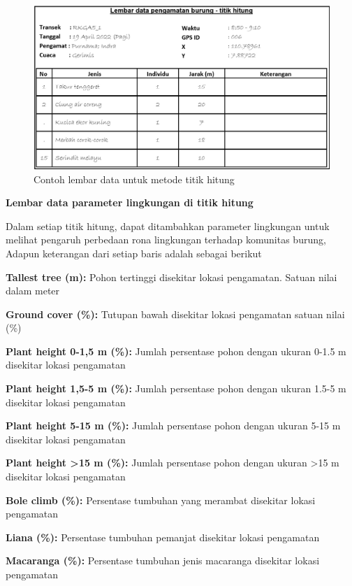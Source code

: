 \documentclass[
  oneside]{book}
\begin{document}
\begin{figure}

{\centering \includegraphics[width=1\linewidth]{images/ldp_th} 

}

\caption{Contoh lembar data untuk metode titik hitung}\label{fig:ldpth}
\end{figure}

\textbf{Lembar data parameter lingkungan di titik hitung}

Dalam setiap titik hitung, dapat ditambahkan parameter lingkungan untuk melihat pengaruh perbedaan rona lingkungan terhadap komunitas burung, Adapun keterangan dari setiap baris adalah sebagai berikut

\textbf{Tallest tree (m):} Pohon tertinggi disekitar lokasi pengamatan. Satuan nilai dalam meter

\textbf{Ground cover (\%):} Tutupan bawah disekitar lokasi pengamatan satuan nilai (\%)

\textbf{Plant height 0-1,5 m (\%):} Jumlah persentase pohon dengan ukuran 0-1.5 m disekitar lokasi pengamatan

\textbf{Plant height 1,5-5 m (\%):} Jumlah persentase pohon dengan ukuran 1.5-5 m disekitar lokasi pengamatan

\textbf{Plant height 5-15 m (\%):} Jumlah persentase pohon dengan ukuran 5-15 m disekitar lokasi pengamatan

\textbf{Plant height \textgreater15 m (\%):} Jumlah persentase pohon dengan ukuran \textgreater15 m disekitar lokasi pengamatan

\textbf{Bole climb (\%):} Persentase tumbuhan yang merambat disekitar lokasi pengamatan

\textbf{Liana (\%):} Persentase tumbuhan pemanjat disekitar lokasi pengamatan

\textbf{Macaranga (\%):} Persentase tumbuhan jenis macaranga disekitar lokasi pengamatan
\end{document}

